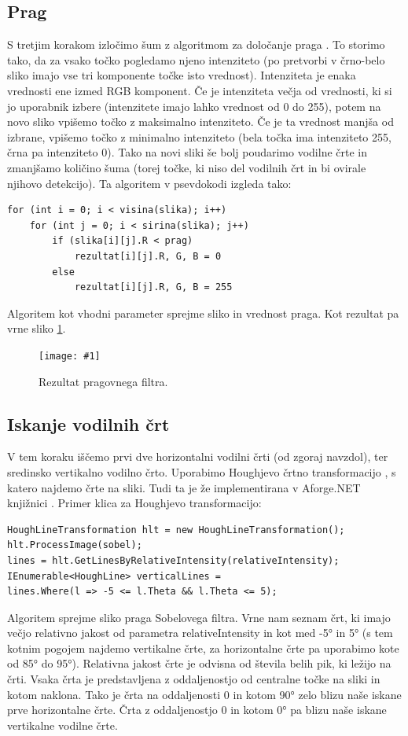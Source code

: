 \documentclass[oneside, a4paper, 12pt]{book}
\newcommand{\slika}[3]{
	\begin{figure}
	\begin{center}
	\texttt{[image: \#1]}
	\end{center}
	\vspace{-20pt}
	\caption{#2}
	\label{#3}
	\end{figure}
}
\begin{document}
\subsection{Prag}
S tretjim korakom izločimo šum z algoritmom za določanje praga 
\cite{treshold-wiki}. To storimo tako, da za vsako točko pogledamo 
njeno intenziteto (po pretvorbi v črno-belo sliko imajo vse tri komponente 
točke isto vrednost). Intenziteta je enaka vrednosti ene izmed RGB 
komponent. Če je intenziteta večja od vrednosti, ki si jo uporabnik 
izbere (intenzitete imajo lahko vrednost od 0 do 255), potem na novo 
sliko vpišemo točko z maksimalno intenziteto. Če je ta vrednost manjša 
od izbrane, vpišemo točko z minimalno intenziteto (bela točka ima 
intenziteto 255, črna pa intenziteto 0). Tako na novi sliki še bolj 
poudarimo vodilne črte in zmanjšamo količino šuma (torej točke, ki 
niso del vodilnih črt in bi ovirale njihovo detekcijo). Ta algoritem 
v psevdokodi izgleda tako:
\begin{samepage}
\begin{verbatim}
for (int i = 0; i < visina(slika); i++)
    for (int j = 0; i < sirina(slika); j++)
        if (slika[i][j].R < prag)
            rezultat[i][j].R, G, B = 0
        else
            rezultat[i][j].R, G, B = 255
\end{verbatim}
\end{samepage}
Algoritem kot vhodni parameter sprejme sliko in vrednost praga. Kot 
rezultat pa vrne sliko \ref{pic:treshold}.

\slika{slike/treshold.jpg}{Rezultat pragovnega filtra.}{pic:treshold}


\subsection{Iskanje vodilnih črt}
V tem koraku iščemo prvi dve horizontalni vodilni črti (od zgoraj 
navzdol), ter sredinsko vertikalno vodilno črto. Uporabimo Houghjevo 
črtno transformacijo \cite{hough-wiki}, s katero najdemo črte na sliki. 
Tudi ta je že implementirana v Aforge.NET knjižnici \cite{hough}. 
Primer klica za Houghjevo transformacijo:
\begin{samepage}
\begin{verbatim}
HoughLineTransformation hlt = new HoughLineTransformation();
hlt.ProcessImage(sobel);
lines = hlt.GetLinesByRelativeIntensity(relativeIntensity);
IEnumerable<HoughLine> verticalLines = 
lines.Where(l => -5 <= l.Theta && l.Theta <= 5);
\end{verbatim}
\end{samepage}
Algoritem sprejme sliko praga Sobelovega filtra. Vrne nam seznam črt, 
ki imajo večjo relativno jakost od parametra relativeIntensity in kot 
med -5° in 5° (s tem kotnim pogojem najdemo vertikalne črte, za 
horizontalne črte pa uporabimo kote od 85° do 95°). Relativna jakost 
črte je odvisna od števila belih pik, ki ležijo na črti. Vsaka črta je 
predstavljena z oddaljenostjo od centralne točke na sliki in kotom naklona. 
Tako je črta na oddaljenosti 0 in kotom 90° zelo blizu naše iskane prve 
horizontalne črte. Črta z oddaljenostjo 0 in kotom 0° pa blizu naše 
iskane vertikalne vodilne črte. \cite{hough} 
\end{document}
